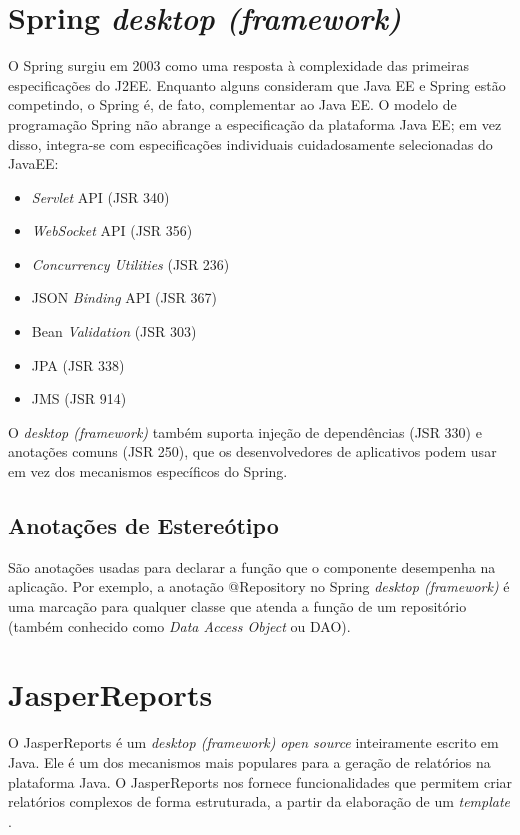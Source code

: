 \section{Spring \textit{desktop (framework)}}
\label{sec:embasamentoTeoricoSpring}

O Spring surgiu em 2003 como uma resposta à complexidade das primeiras especificações do J2EE. Enquanto alguns consideram que Java EE e Spring estão competindo, o Spring é, de fato, complementar ao Java EE. O modelo de programação Spring não abrange a especificação da plataforma Java EE; em vez disso, integra-se com especificações individuais cuidadosamente selecionadas do JavaEE:

\begin{itemize}
    \item \textit{Servlet} API (JSR 340)
    \item \textit{WebSocket} API (JSR 356)
    \item \textit{Concurrency Utilities} (JSR 236)
    \item JSON \textit{Binding} API (JSR 367)
    \item Bean \textit{Validation} (JSR 303)
    \item JPA (JSR 338)
    \item JMS (JSR 914)
\end{itemize}

O \textit{desktop (framework)} também suporta injeção de dependências (JSR 330)  e anotações comuns (JSR 250), que os desenvolvedores de aplicativos podem usar em vez dos mecanismos específicos do Spring.

\subsection{Anotações de Estereótipo}
São anotações usadas para declarar a função que o componente desempenha na aplicação. Por exemplo, a anotação @Repository no Spring \textit{desktop (framework)} é uma marcação para qualquer classe que atenda a função de um repositório (também conhecido como \textit{Data Access Object} ou DAO).

\section{JasperReports}
\label{sec:embasamentoTeoricoJasper}

O JasperReports é um \textit{desktop (framework)} \textit{open source} inteiramente escrito em Java. Ele é um dos mecanismos mais populares para a geração de relatórios na plataforma Java.
O JasperReports nos fornece funcionalidades que permitem criar relatórios complexos de forma estruturada, a partir da elaboração de um \textit{template} \cite{Devmedia2012}.

